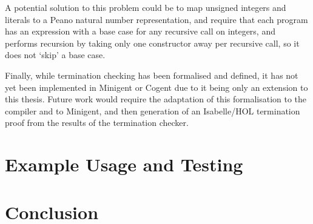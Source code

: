 A potential solution to this problem could be to map unsigned integers
and literals to a Peano natural number representation, and require that
each program has an expression with a base case for any recursive call
on integers, and performs recursion by taking only one constructor
away per recursive call, so it does not `skip' a base case.

Finally, while termination checking has been formalised and defined,
it has not yet been implemented in Minigent or Cogent due to it being
only an extension to this thesis. Future work would require the adaptation
of this formalisation to the compiler and to Minigent, and then
generation of an Isabelle/HOL termination proof from the results
of the termination checker.

\section{Example Usage and Testing}
\label{ch:examplesandtesting}


\section{Conclusion}

